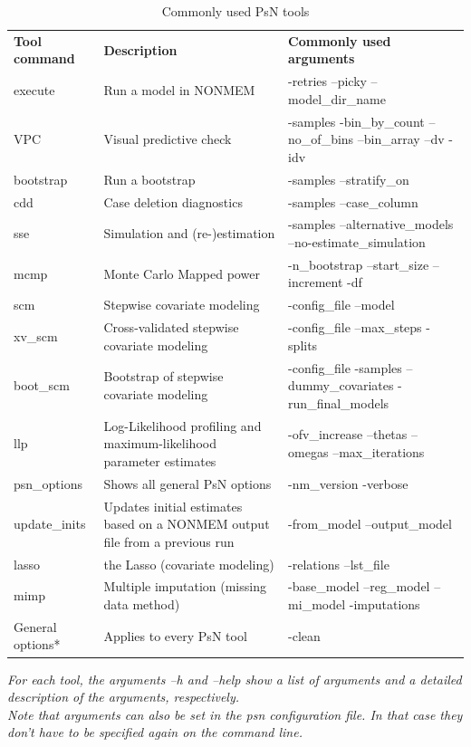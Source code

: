 \begin{landscape}
\begin{table}[ht]
\caption{Commonly used PsN tools}
\vspace{10pt}
\footnotesize
\begin{tabular}{ p{3.1cm} p{6cm} p{7.5cm}}
\textbf{Tool command} &  \textbf{Description} & \textbf{Commonly used arguments}\\
execute & Run a model in NONMEM & -retries –picky –model\_dir\_name \\
VPC & Visual predictive check & -samples -bin\_by\_count –no\_of\_bins –bin\_array –dv -idv\\
bootstrap & Run a bootstrap & -samples –stratify\_on \\
cdd & Case deletion diagnostics & -samples –case\_column \\
sse & Simulation and (re-)estimation & -samples –alternative\_models –no-estimate\_simulation \\
mcmp & Monte Carlo Mapped power & -n\_bootstrap –start\_size –increment -df \\
scm & Stepwise covariate modeling & -config\_file –model \\
xv\_scm & Cross-validated stepwise covariate modeling & -config\_file –max\_steps -splits \\
boot\_scm & Bootstrap of stepwise covariate modeling & -config\_file -samples –dummy\_covariates -run\_final\_models \\
llp & Log-Likelihood profiling and maximum-likelihood parameter estimates & -ofv\_increase –thetas –omegas –max\_iterations \\
psn\_options & Shows all general PsN options & -nm\_version -verbose \\
update\_inits & Updates initial estimates based on a NONMEM output file from a previous run & -from\_model –output\_model \\
lasso & the Lasso (covariate modeling) & -relations –lst\_file \\
mimp & Multiple imputation (missing data method) & -base\_model –reg\_model –mi\_model -imputations \\
General options* & Applies to every PsN tool  & -clean \\

\end{tabular}

\bigskip

\textit{
\noindent For each tool, the arguments –h and –help show a list of arguments and a detailed description of the arguments, respectively. \\
\noindent Note that arguments can also be set in the psn configuration file. 
In that case they don’t have to be specified again on the command line.
}

\end{table}
\end{landscape}

